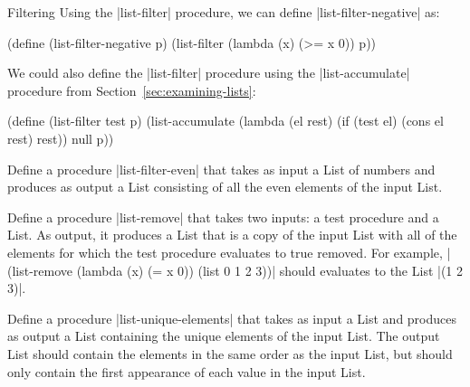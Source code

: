 \begin{schemeregion}
\begin{examplenobar}{Filtering}
Using the \scheme|list-filter| procedure, we can define \scheme|list-filter-negative| as:
\begin{schemedisplay}
(define (list-filter-negative p) (list-filter (lambda (x) (>= x 0)) p))
\end{schemedisplay}

We could also define the \scheme|list-filter| procedure using the \scheme|list-accumulate| procedure from Section~\ref{sec:examining-lists}:
\begin{schemedisplay}
(define (list-filter test p)
  (list-accumulate 
    (lambda (el rest) (if (test el) (cons el rest) rest)) 
    null 
    p))
\end{schemedisplay}


\beforeex
\begin{exercise}
Define a procedure \scheme|list-filter-even| that takes as input a List of numbers and produces as output a List consisting of all the even elements of the input List.  
\solution{\LATER{}}
\end{exercise}
\afterex

\beforeex
\begin{exercise}\bluestar
Define a procedure \scheme|list-remove| that takes two inputs: a test procedure and a List.  As output, it produces a List that is a copy of the input List with all of the elements for which the test procedure evaluates to true removed.  For example, \scheme|(list-remove (lambda (x) (= x 0)) (list 0 1 2 3))| should evaluates to the List \schemeresult|(1 2 3)|.
\solution{\LATER{}}
\end{exercise}
\afterex

\beforeex
\begin{exercise}
\doublegoldstar
Define a procedure \scheme|list-unique-elements| that takes as input a List and produces as output a List containing the unique elements of the input List.  The output List should contain the elements in the same order as the input List, but should only contain the first appearance of each value in the input List.
\solution{\LATER{}}
\end{exercise}
\afterex

\end{examplenobar}


\end{schemeregion}
